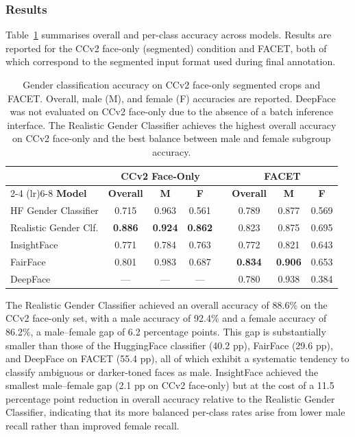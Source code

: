 \subsubsection{Results}

Table~\ref{tab:gender_results} summarises overall and per-class accuracy across models. Results are reported for the CCv2 face-only (segmented) condition and FACET, both of which correspond to the segmented input format used during final annotation.

\begin{table}[htbp]
	\centering
	\caption{Gender classification accuracy on CCv2 face-only segmented crops and FACET. Overall, male (M), and female (F) accuracies are reported. DeepFace was not evaluated on CCv2 face-only due to the absence of a batch inference interface. The Realistic Gender Classifier achieves the highest overall accuracy on CCv2 face-only and the best balance between male and female subgroup accuracy.}
	\label{tab:gender_results}
	\begin{tabular}{lccccccc}
		\toprule
		& \multicolumn{3}{c}{\textbf{CCv2 Face-Only}} & & \multicolumn{3}{c}{\textbf{FACET}} \\
		\cmidrule(lr){2-4} \cmidrule(lr){6-8}
		\textbf{Model} & \textbf{Overall} & \textbf{M} & \textbf{F} & & \textbf{Overall} & \textbf{M} & \textbf{F} \\
		\midrule
		HF Gender Classifier   & 0.715 & 0.963 & 0.561 & & 0.789 & 0.877 & 0.569 \\
		Realistic Gender Clf.  & \textbf{0.886} & \textbf{0.924} & \textbf{0.862} & & 0.823 & 0.875 & 0.695 \\
		InsightFace            & 0.771 & 0.784 & 0.763 & & 0.772 & 0.821 & 0.643 \\
		FairFace               & 0.801 & 0.983 & 0.687 & & \textbf{0.834} & \textbf{0.906} & 0.653 \\
		DeepFace               & ---   & ---   & ---   & & 0.780 & 0.938 & 0.384 \\
		\bottomrule
	\end{tabular}
\end{table}

The Realistic Gender Classifier achieved an overall accuracy of 88.6\% on the CCv2 face-only set, with a male accuracy of 92.4\% and a female accuracy of 86.2\%, a male--female gap of 6.2 percentage points. This gap is substantially smaller than those of the HuggingFace classifier (40.2 pp), FairFace (29.6 pp), and DeepFace on FACET (55.4 pp), all of which exhibit a systematic tendency to classify ambiguous or darker-toned faces as male. InsightFace achieved the smallest male--female gap (2.1 pp on CCv2 face-only) but at the cost of a 11.5 percentage point reduction in overall accuracy relative to the Realistic Gender Classifier, indicating that its more balanced per-class rates arise from lower male recall rather than improved female recall.

